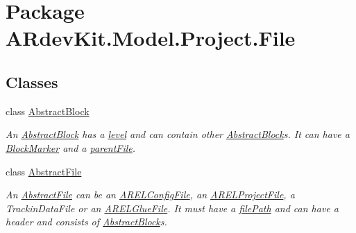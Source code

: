 \hypertarget{namespace_a_rdev_kit_1_1_model_1_1_project_1_1_file}{\section{Package A\-Rdev\-Kit.\-Model.\-Project.\-File}
\label{namespace_a_rdev_kit_1_1_model_1_1_project_1_1_file}
}
\subsection*{Classes}
\begin{DoxyCompactItemize}
\item 
class \hyperlink{class_a_rdev_kit_1_1_model_1_1_project_1_1_file_1_1_abstract_block}{Abstract\-Block}
\begin{DoxyCompactList}\small\item\em An \hyperlink{class_a_rdev_kit_1_1_model_1_1_project_1_1_file_1_1_abstract_block}{Abstract\-Block} has a \hyperlink{class_a_rdev_kit_1_1_model_1_1_project_1_1_file_1_1_abstract_block_a7c07abfe27f2f9104fe7c3d23c7333a5}{level} and can contain other \hyperlink{class_a_rdev_kit_1_1_model_1_1_project_1_1_file_1_1_abstract_block}{Abstract\-Block}s. It can have a \hyperlink{class_a_rdev_kit_1_1_model_1_1_project_1_1_file_1_1_block_marker}{Block\-Marker} and a \hyperlink{class_a_rdev_kit_1_1_model_1_1_project_1_1_file_1_1_abstract_block_a7dd07d5a865359c764a8cdab272a0662}{parent\-File}. \end{DoxyCompactList}\item 
class \hyperlink{class_a_rdev_kit_1_1_model_1_1_project_1_1_file_1_1_abstract_file}{Abstract\-File}
\begin{DoxyCompactList}\small\item\em An \hyperlink{class_a_rdev_kit_1_1_model_1_1_project_1_1_file_1_1_abstract_file}{Abstract\-File} can be an \hyperlink{class_a_rdev_kit_1_1_model_1_1_project_1_1_file_1_1_a_r_e_l_config_file}{A\-R\-E\-L\-Config\-File}, an \hyperlink{class_a_rdev_kit_1_1_model_1_1_project_1_1_file_1_1_a_r_e_l_project_file}{A\-R\-E\-L\-Project\-File}, a Trackin\-Data\-File or an \hyperlink{class_a_rdev_kit_1_1_model_1_1_project_1_1_file_1_1_a_r_e_l_glue_file}{A\-R\-E\-L\-Glue\-File}. It must have a \hyperlink{class_a_rdev_kit_1_1_model_1_1_project_1_1_file_1_1_abstract_file_ad879e3a81860da8b72f2d9f61a18ab3b}{file\-Path} and can have a header and consists of \hyperlink{class_a_rdev_kit_1_1_model_1_1_project_1_1_file_1_1_abstract_block}{Abstract\-Block}s. \end{DoxyCompactList}\item 

\end{DoxyCompactItemize}
